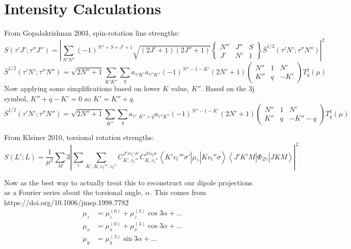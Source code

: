 \documentclass{article}
\begin{document}
\section{Intensity Calculations}
From Gopalakrishnan 2003, spin-rotation line strengths:
\begin{equation}
S(\tau'J';\tau''J'') = \left|\sum_{N'N''}(-1)^{N''+S+J'+1} \sqrt{(2J'+1)(2J''+1)} 
\begin{Bmatrix}
	N'' & J'' & S \\
	J' & N' & 1
\end{Bmatrix}
\bar{S}^{1/2}(\tau'N';\tau''N'')
\right|^{2}
\end{equation}
\begin{equation}
	\bar{S}^{1/2}(\tau'N';\tau''N'') = \sqrt{2N''+1}\sum_{K'K''}\sum_{q} a_{\tau'K'}a_{\tau''K''} (-1)^{N''-1-K'}(2N'+1) 
\begin{pmatrix}
	N'' & 1 & N' \\
	K'' & q & -K'
\end{pmatrix}
T^{1}_{q}(\mu)
\end{equation}
Now applying some simplifications based on lower $K$ value, $K''$. Based on the 3j symbol, $K''+q-K'=0$ so $K'=K''+q$.
\begin{equation}
	\bar{S}^{1/2}(\tau'N';\tau''N'') = \sqrt{2N''+1}\sum_{K''}\sum_{q} a_{\tau',K''+q}a_{\tau''K''} (-1)^{N''-1-K'}(2N'+1) 
	\begin{pmatrix}
		N'' & 1 & N' \\
		K'' & q & -K''-q
	\end{pmatrix}
	T^{1}_{q}(\mu)
\end{equation}

From Kleiner 2010, torsional rotation strengths:
\begin{equation}
S(L';L) = \frac{1}{\mu^{2}}\sum_{M} 3\left| \sum_{\gamma} \sum_{K',K,v_{t}''',v_{t}''}  C^{J'\tau v_{t}'\sigma'}_{K',v_{t}'''}C^{J\tau v_{t}\sigma}_{K,v_{t}''} \left\langle K'v_{t}'''\sigma'\left|\mu_{\gamma}\right| K v_{t}''\sigma \right\rangle \left\langle J'K'M\left|\Phi_{Z\gamma}\right| JKM\right\rangle \right|^{2}
\end{equation}

Now as the best way to actually treat this to reconstruct our dipole projections as a Fourier series about the torsional angle, $\alpha$. This comes from https://doi.org/10.1006/jmsp.1998.7782
\begin{align}
	\mu_{z} &= \mu^{(0)}_{z} + \mu^{(3)}_{z}\cos3\alpha + ... \\
	\mu_{x} &= \mu^{(0)}_{x} + \mu^{(3)}_{x}\cos3\alpha + ... \\
	\mu_{y} &= \mu^{(3)}_{y}\sin3\alpha + ... \\
\end{align}
\end{document}
